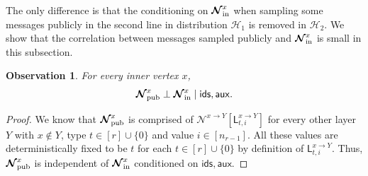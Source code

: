 \documentclass[11pt]{article}
\newtheorem{observation}[lemma]{Observation}
\theoremstyle{definition}
\newcommand{\rv}[1]{\ensuremath{{\mathsf{#1}}}\xspace}
\newcommand{\Nbhood}[3]{\ensuremath{\mathcal{N}^{#1_{#3} \to #2}}}
\newcommand{\rNinner}[2]{\ensuremath{\bm{\mathcal{N}}_{\textnormal{in}}^{#1_{#2}}}}
\newcommand{\cH}{\ensuremath{\mathcal{H}}}
\newcommand{\raux}{\ensuremath{\rv{aux}}}
\newcommand{\rLupdown}[2]{\ensuremath{\rv{L}^{#1}_{#2}}}
\newcommand{\rNpub}[1]{\ensuremath{\bm{\mathcal{N}}_{\textnormal{pub}}^{#1}}}
\newcommand{\rids}{\ensuremath{\rv{ids}}}
\begin{document}
 The only difference is that the conditioning on $\rNinner{x}{}$ when sampling some messages publicly in the second line in distribution $\cH_1$  is removed in $\cH_2$. We show that the correlation between messages sampled publicly and $\rNinner{x}{}$ is small in this subsection. 

\begin{observation}\label{obs:re-inter1}
For every inner vertex $x$, 
\[
\rNpub{x} \perp \rNinner{x}{} \mid \rids, \raux.
\]
\end{observation}
\begin{proof}
We know that $\rNpub{x}$ is comprised of $\Nbhood{x}{Y}{}[\rLupdown{x \to Y}{t, i}]$ for every other layer $Y$ with $x \notin Y$, type $t \in [r] \cup \{0\}$ and value $i \in [n_{r-1}]$. All these values are deterministically fixed to be $t$ for each $t \in [r] \cup \{0\}$ by definition of $\rLupdown{x \to Y}{t, i}$. Thus, $\rNpub{x}$ is independent of $\rNinner{x}{}$ conditioned on $\rids, \raux$.
\end{proof}
\end{document}
